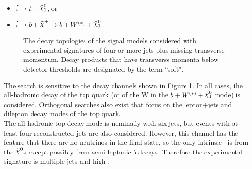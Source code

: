 \begin{itemize}
\item $\stop \rightarrow t + \ninoone$, or
\item  $\stop \rightarrow b + \chinopm \rightarrow b + W^{(\ast)} + \ninoone$.
\end{itemize}



\begin{figure}[htb]
\begin{center}
\hspace{0.05\textwidth}
\hspace{0.05\textwidth}
\hspace{0.05\textwidth}
\hspace{0.05\textwidth}
\end{center}
\caption[Top quark decay topologies.]{The decay topologies of the signal models considered with experimental signatures of four or more jets plus missing transverse momentum. Decay products that have transverse momenta below detector thresholds are designated by the term ``soft".}
\label{fig:feynDiagModels}
\end{figure}


The search is sensitive to the decay channels shown in Figure \ref{fig:feynDiagModels}.  In all cases, the all-hadronic decay of the top quark (or of the W in the $b + W^{(\ast)}
+ \ninoone$ mode) is considered. Orthogonal searches also exist that
focus on the lepton+jets\cite{stop1L13tev} and dilepton\cite{stop2L13tev} decay modes of the top quark. \\

The all-hadronic top decay mode is nominally
with six jets, but events with at least four reconstructed jets are also
considered. However, this channel has the feature that there are no
neutrinos in the final state, so the only intrinsic \met\ is from the
$\nino$s except possibly from semi-leptonic $b$ decays.  Therefore the experimental
signature is multiple jets and high \met.  \\

